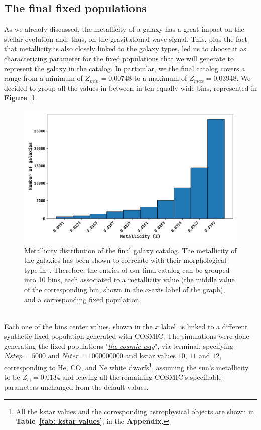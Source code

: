 \subsection{The final fixed populations}
As we already discussed, the metallicity of a galaxy has a great impact on the stellar evolution and, thus, on the gravitational wave signal.
This, plus the fact that metallicity is also closely linked to the galaxy types, led us to choose it as characterizing parameter for the fixed populations that we will generate to represent the galaxy in the catalog.
In particular, we the final catalog covers a range from a minimum of $ Z_{min}= 0.00748$ to a maximum of $Z_{max}= 0.03948$.
We decided to group all the values in between in ten equally wide bins, represented in \textbf{Figure~\ref{fig: Z distribution of final catalog}}.
\begin{figure}[h!]
    \begin{center}
        \includegraphics[width=\textwidth]{images/z_distro_gwgc_completed_ZOA.pdf}
    \end{center}
    \caption{Metallicity distribution of the final galaxy catalog. 
    The metallicity of the galaxies has been shown to correlate with their morphological type in~\cite{Faber&Gallagher}.
    Therefore, the entries of our final catalog can be grouped into 10 bins, each associated to a metallicity value (the middle value of the corresponding bin, shown in the $x$-axis label of the graph), and a corresponding fixed population.
    }\label{fig: Z distribution of final catalog}
\end{figure}\\
Each one of the bins center values, shown in the $x$ label, is linked to a different synthetic fixed population generated with COSMIC.
The simulations were done generating the fixed populations "\textit{\href{https://cosmic-popsynth.github.io/docs/stable/pages/fixedpop.html}{the cosmic way}}", via terminal, specifying $Nstep = 5000$ and $Niter=1000000000$ and kstar values $10$, $11$ and $12$, corresponding to He, CO, and Ne white dwarfs\footnote{All the kstar values and the corresponding astrophysical objects are shown in \textbf{Table~\ref{tab: kstar values}}, in the \textbf{Appendix}.}, assuming the sun's metallicity to be $Z_\odot = 0.0134$ and leaving all the remaining COSMIC's specifiable parameters unchanged from the default values.


